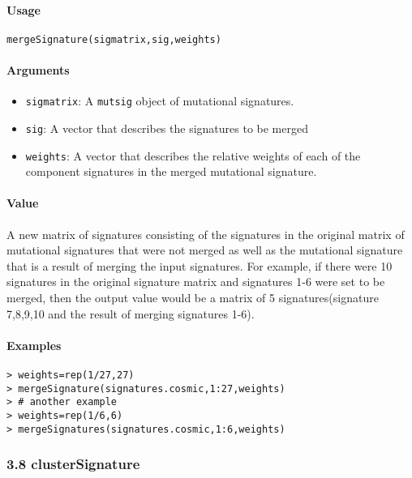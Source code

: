 \documentclass[]{article}
\providecommand{\tightlist}{%
  \setlength{\itemsep}{0pt}\setlength{\parskip}{0pt}}
\let\oldparagraph\paragraph
\renewcommand{\paragraph}[1]{\oldparagraph{#1}\mbox{}}
\begin{document}
\paragraph{\texorpdfstring{\textbf{Usage}}{Usage}}\label{usage-6}

\texttt{mergeSignature(sigmatrix,sig,weights)}

\paragraph{\texorpdfstring{\textbf{Arguments
}}{Arguments }}\label{arguments-5}

\begin{itemize}
\tightlist
\item
  \texttt{sigmatrix}: A \texttt{mutsig} object of mutational signatures.
\item
  \texttt{sig}: A vector that describes the signatures to be merged
\item
  \texttt{weights}: A vector that describes the relative weights of each
  of the component signatures in the merged mutational signature.
\end{itemize}

\paragraph{\texorpdfstring{\textbf{Value}}{Value}}\label{value-4}

A new matrix of signatures consisting of the signatures in the original
matrix of mutational signatures that were not merged as well as the
mutational signature that is a result of merging the input signatures.
For example, if there were 10 signatures in the original signature
matrix and signatures 1-6 were set to be merged, then the output value
would be a matrix of 5 signatures(signature 7,8,9,10 and the result of
merging signatures 1-6).

\paragraph{\texorpdfstring{\textbf{Examples}}{Examples}}\label{examples-6}

\begin{verbatim}
> weights=rep(1/27,27)      
> mergeSignature(signatures.cosmic,1:27,weights)
> # another example
> weights=rep(1/6,6)  
> mergeSignatures(signatures.cosmic,1:6,weights)   
\end{verbatim}

\subsubsection{3.8 clusterSignature}\label{clustersignature}
\end{document}
